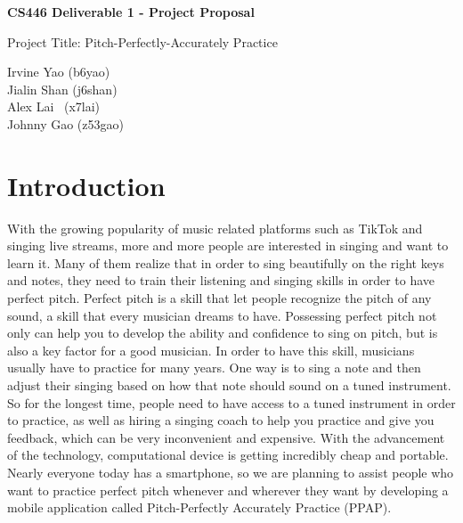 \documentclass{article}
\author{Irvine Yao (b6yao)\\Jialin Shan (j6shan)\\Alex Lai (x7lai)\\Johnny Gao (z53gao)}
\begin{document}
\begin{titlepage}
  \begin{center}
    \Large\textbf{CS446 Deliverable 1 - Project Proposal}
   \vspace{50px}

    \Large{Project Title: Pitch-Perfectly-Accurately Practice}
   \vspace{50px}

    \large{Irvine Yao (b6yao)\\Jialin Shan (j6shan)\\Alex Lai \ (x7lai)\\Johnny Gao (z53gao)}
  \end{center}
  
\end{titlepage}
  
\section{Introduction}
\qquad
With the growing popularity of music related platforms such as TikTok and singing live streams, more and more people are interested in singing and want to learn it. Many of them realize that in order to sing beautifully on the right keys and notes, they need to train their listening and singing skills in order to have perfect pitch. Perfect pitch is a skill that let people recognize the pitch of any sound, a skill that every musician dreams to have. Possessing perfect pitch not only can help you to develop the ability and confidence to sing on pitch, but is also a key factor for a good musician. In order to have this skill, musicians usually have to practice for many years. One way is to sing a note and then adjust their singing based on how that note should sound on a tuned instrument. So for the longest time, people need to have access to a tuned instrument in order to practice, as well as hiring a singing coach to help you practice and give you feedback, which can be very inconvenient and expensive. With the advancement of the technology, computational device is getting incredibly cheap and portable. Nearly everyone today has a smartphone, so we are planning to assist people who want to practice perfect pitch whenever and wherever they want by developing a mobile application called Pitch-Perfectly Accurately Practice (PPAP). 

\qquad
\end{document}
